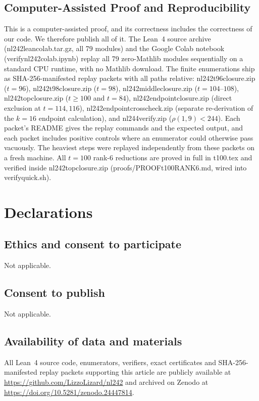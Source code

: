 \documentclass[11pt]{article}
\theoremstyle{definition}
\newcommand{\code}[1]{{\ttfamily\small\renewcommand{\_}{\textunderscore\allowbreak}#1}}
\begin{document}
\subsection{Computer-Assisted Proof and Reproducibility}
This is a computer-assisted proof, and its correctness includes the correctness of our code. We therefore publish all of it.
The Lean~4 source archive (\code{nl242\_lean\_colab.tar.gz}, all 79 modules) and the Google Colab notebook (\code{verify\_nl242\_colab.ipynb}) replay all 79 zero-Mathlib modules sequentially on a standard CPU runtime, with no Mathlib download.
The finite enumerations ship as SHA-256-manifested replay packets with all paths relative:
\code{nl242\_t96\_closure.zip} ($t = 96$),
\code{nl242\_t98\_closure.zip} ($t = 98$),
\code{nl242\_middle\_closure.zip} ($t = 104$--$108$),
\code{nl242\_top\_closure.zip} ($t \ge 100$ and $t = 84$),
\code{nl242\_endpoint\_closure.zip} (direct exclusion at $t=114,116$),
\code{nl242\_endpoint\_crosscheck.zip} (separate re-derivation of the $k=16$ endpoint calculation),
and \code{nl244\_verify.zip} ($\rho(1,9) < 244$).
Each packet's README gives the replay commands and the expected output, and each packet includes positive controls where an enumerator could otherwise pass vacuously.
The heaviest steps were replayed independently from these packets on a fresh machine. All $t = 100$ rank-$6$ reductions are proved in full in \code{t100.tex} and verified inside \code{nl242\_top\_closure.zip} (\code{proofs/PROOF\_t100\_RANK6.md}, wired into \code{verify\_quick.sh}).

\section*{Declarations}

\subsection*{Ethics and consent to participate}
Not applicable.

\subsection*{Consent to publish}
Not applicable.

\subsection*{Availability of data and materials}
All Lean~4 source code, enumerators, verifiers, exact certificates and SHA-256-manifested replay packets supporting this article are publicly available at \url{https://github.com/LizzoLizard/nl242} and archived on Zenodo at \url{https://doi.org/10.5281/zenodo.24447814}.
\end{document}
